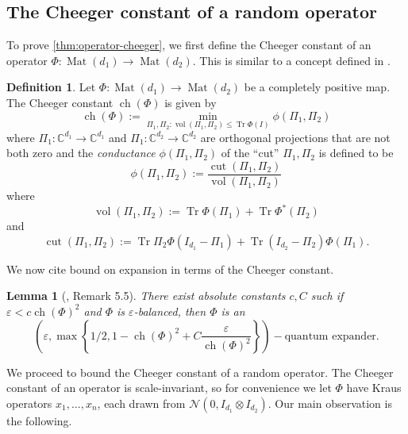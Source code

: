 \documentclass[aos]{imsart}
\newtheorem{lemma}[theorem]{Lemma}
\theoremstyle{definition}
\newtheorem*{definition}{Definition}
\numberwithin{equation}{section}
\DeclareMathOperator{\vol}{vol}
\DeclareMathOperator{\cut}{cut}
\DeclareMathOperator{\ch}{ch}
\DeclareMathOperator{\Mat}{Mat}
\DeclareMathOperator{\tr}{Tr}
\newcommand{\C}{{\mathbb{C}}}
\newcommand{\ot}{\otimes}
\newcommand{\eps}{\varepsilon}
\newcommand{\cN}{\mathcal{N}}
\newcommand{\samp}{x}
\begin{document}
\begin{appendix}
\section{The Cheeger constant of a random operator}\label{app:cheeky}

To prove \cref{thm:operator-cheeger}, we first define the Cheeger constant of an operator $\Phi:\Mat(d_1) \to \Mat(d_2)$. This is similar to a concept defined in \cite{H07}.
\begin{definition}
Let $\Phi : \Mat(d_1) \to \Mat(d_2)$ be a completely positive map. The Cheeger constant $\ch(\Phi)$ is given by
$$\ch(\Phi):=\min_{\Pi_1, \Pi_2: \vol(\Pi_1, \Pi_2) \leq \tr \Phi(I)} \phi(\Pi_1,\Pi_2)$$
where $\Pi_1: \C^{d_1} \to \C^{d_1}$ and $\Pi_1: \C^{d_2} \to \C^{d_2}$ are orthogonal projections that are not both zero and the \emph{conductance} $\phi(\Pi_1, \Pi_2)$ of the ``cut'' $\Pi_1, \Pi_2$ is defined to be
$$\phi(\Pi_1,\Pi_2) := \frac{\cut(\Pi_1, \Pi_2)}{\vol(\Pi_1,\Pi_2)}$$
where
$$ \vol(\Pi_1,\Pi_2):=
\tr \Phi(\Pi_1) + \tr \Phi^*(\Pi_2)$$
and $$ \cut(\Pi_1, \Pi_2):= \tr \Pi_2 \Phi(I_{d_1} - \Pi_1) + \tr (I_{d_2} - \Pi_2) \Phi(\Pi_1).$$
\end{definition}

We now cite bound on expansion in terms of the Cheeger constant.

\begin{lemma} [\cite{FM20}, Remark 5.5]\label{lem:op-cheeger} There exist absolute constants $c, C$ such if $\eps < c \ch(\Phi)^2$ and $\Phi$ is $\eps$-balanced, then $\Phi$ is an
$$ \left(\eps, \max\left\{1/2, 1 -  \ch(\Phi)^2 + C \frac{\eps}{\ch(\Phi)^2} \right\} \right)-\text{quantum expander}.$$
\end{lemma}
We proceed to bound the Cheeger constant of a random operator. The Cheeger constant of an operator is scale-invariant, so for convenience we let $\Phi$ have Kraus operators $\samp_1, \dots, \samp_n$, each drawn from $\cN(0,  I_{d_1} \ot I_{d_2}).$ Our main observation is the following.


\end{appendix}
\end{document}

